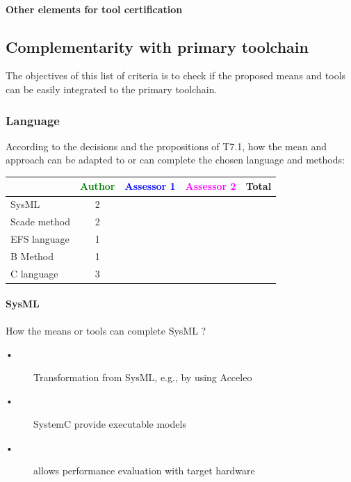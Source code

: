 \paragraph{Other elements for tool certification}


\subsection{Complementarity with primary toolchain}

The objectives of this list of criteria is to check if the proposed means and tools can be easily integrated to the primary toolchain.

\subsubsection{Language}


According to the decisions and the propositions of T7.1, how the mean and approach can be adapted to or can complete the chosen language and methods:

\begin{tabular}{|l | c | c | c | c|}
\hline
& \textcolor{green}{Author} & \textcolor{blue}{Assessor 1} & \textcolor{magenta}{Assessor 2} & Total \\
\hline 
SysML  &2 & & & \\
\hline
Scade method &2 & & & \\
\hline
EFS language &1 & & & \\
\hline
B Method &1 & & & \\
\hline
C language &3 & & & \\
\hline
\end{tabular}

\paragraph{SysML}
How the means or tools can complete SysML ?

\begin{author_comment}
\begin{description}
\item [•] Transformation from SysML, e.g., by using Acceleo
\item [•] SystemC provide executable models
\item [•] allows performance evaluation with target hardware
\end{description}
\end{author_comment}

